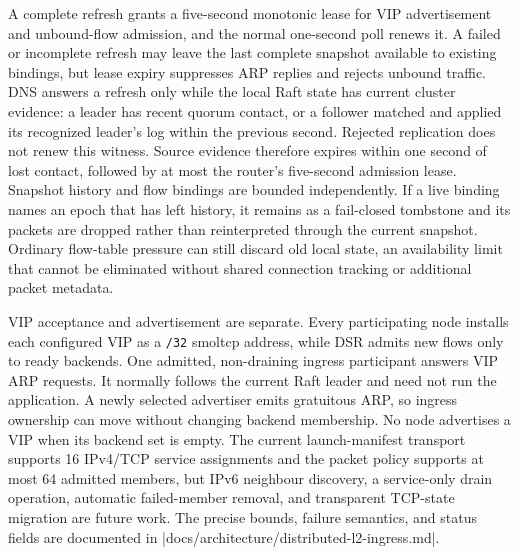 A complete refresh grants a five-second monotonic lease for VIP advertisement
and unbound-flow admission, and the normal one-second poll renews it. A failed or
incomplete refresh may leave the last complete snapshot available to existing
bindings, but lease expiry suppresses ARP replies and rejects unbound traffic.
DNS answers a refresh only while the local Raft state has current cluster
evidence: a leader has recent quorum contact, or a follower matched and applied
its recognized leader's log within the previous second. Rejected replication
does not renew this witness. Source evidence therefore expires within one
second of lost contact, followed by at most the router's five-second admission
lease.
Snapshot history and flow bindings are bounded independently. If a live
binding names an epoch that has left history, it remains as a fail-closed
tombstone and its packets are dropped rather than reinterpreted through the
current snapshot. Ordinary flow-table pressure can still discard old local
state, an availability limit that cannot be eliminated without shared
connection tracking or additional packet metadata.

VIP acceptance and advertisement are separate. Every participating node
installs each configured VIP as a \texttt{/32} smoltcp address, while DSR admits
new flows only to ready backends. One admitted, non-draining ingress participant
answers VIP ARP requests. It normally follows the current Raft leader and need
not run the application. A newly selected advertiser emits gratuitous ARP, so
ingress ownership can move without changing backend membership. No node
advertises a VIP when its backend set is empty. The current launch-manifest
transport supports 16 IPv4/TCP service assignments and the packet policy
supports at most 64 admitted members, but
IPv6 neighbour discovery, a service-only drain operation, automatic failed-member
removal, and transparent TCP-state migration are future work. The
precise bounds, failure semantics, and status fields are documented in
\repofile|docs/architecture/distributed-l2-ingress.md|.

